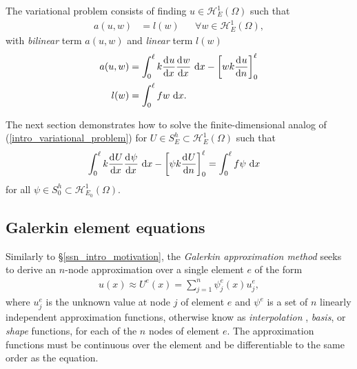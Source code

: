 The variational problem consists of finding $u \in \mathscr{H}_E^1(\Omega)$ such that
\begin{align}
  \label{intro_variational_problem}
  a(u,w) &= l(w) && \forall w \in \mathscr{H}_E^1(\Omega),
\end{align}
with  \emph{bilinear} term $a(u,w)$ and \emph{linear} term $l(w)$ \citep{reddy_1993}
\begin{align*}
  a(u,w) &= \int_0^{\ell} k \frac{\mathrm{d}^{} u}{\mathrm{d} x^{} } \frac{\mathrm{d}^{} w}{\mathrm{d} x^{} } \ \mathrm{d}x - \left[ wk\frac{\mathrm{d}^{} u}{\mathrm{d} n^{} }\right]_0^{\ell} \\
  l(w)   &= \int_0^{\ell} f w \ \mathrm{d}x.
\end{align*}

The next section demonstrates how to solve the finite-dimensional analog of (\ref{intro_variational_problem}) for $U \in S_E^h \subset \mathscr{H}_E^1(\Omega)$ such that
\begin{align}
  \label{intro_discrete_variational_problem}
  \int_0^{\ell} k \frac{\mathrm{d}^{} U}{\mathrm{d} x^{} } \frac{\mathrm{d}^{} \psi}{\mathrm{d} x^{} } \ \mathrm{d}x - \left[ \psi k \frac{\mathrm{d}^{} U}{\mathrm{d} n^{} }\right]_0^{\ell} &= \int_0^{\ell} f \psi \ \mathrm{d}x
\end{align}
for all $\psi \in S_0^h \subset \mathscr{H}_{E_0}^1(\Omega)$.

\subsection{Galerkin element equations} \label{ssn_intro_galerkin_equations}

Similarly to \S \ref{ssn_intro_motivation}, the  \emph{Galerkin approximation method} seeks to derive an $n$-node approximation over a single element $e$ of the form
\begin{align}
  \label{intro_approximation}
  u(x) \approx U^e(x) = \sum_{j=1}^n \psi_j^e(x) u_j^e,
\end{align}
where $u_j^e$ is the unknown value at node $j$ of element $e$ and $\psi^e$ is a set of $n$ linearly independent approximation functions, otherwise know as   \emph{interpolation} , \emph{basis}, or \emph{shape} functions, for each of the $n$ nodes of element $e$.  The approximation functions must be continuous over the element and be differentiable to the same order as the equation.

